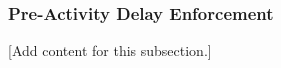
\subsubsection{Pre-Activity Delay Enforcement}
\label{subsubsec:design_8_4_preactivity_delay_enforcement}

[Add content for this subsection.]
